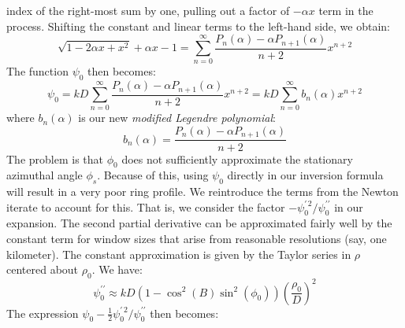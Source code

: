 \documentclass{article}
\begin{document}
        index of the right-most sum by one, pulling out a factor of $-\alpha{x}$
        term in the process. Shifting the constant and linear terms to
        the left-hand side, we obtain:
        \begin{equation}
            \sqrt{1-2\alpha{x}+x^{2}}+\alpha{x}-1
            =\sum_{n=0}^{\infty}
                \frac{P_{n}(\alpha)-\alpha{P}_{n+1}(\alpha)}{n+2}x^{n+2}
        \end{equation}
        The function $\psi_{0}$ then becomes:
        \begin{equation}
            \psi_{0}
            =kD\sum_{n=0}^{\infty}
                \frac{P_{n}(\alpha)-\alpha{P}_{n+1}(\alpha)}{n+2}x^{n+2}
            =kD\sum_{n=0}^{\infty}
                b_{n}(\alpha)x^{n+2}
        \end{equation}
        where $b_{n}(\alpha)$ is our new
        \textit{modified Legendre polynomial}:
        \begin{equation}
            b_{n}(\alpha)=\frac{P_{n}(\alpha)-\alpha{P}_{n+1}(\alpha)}{n+2}
        \end{equation}
        The problem is that $\phi_{0}$ does not sufficiently approximate the
        stationary azimuthal angle $\phi_{s}$. Because of this, using
        $\psi_{0}$ directly in our inversion formula will result in a
        very poor ring profile. We reintroduce the terms from the Newton
        iterate to account for this. That is, we consider the
        factor $-\psi^{\prime\,2}_{0}/\psi^{\prime\prime}_{0}$ in our
        expansion. The second partial
        derivative can be approximated fairly well by the constant term
        for window sizes that arise from reasonable resolutions
        (say, one kilometer). The constant approximation is given by the
        Taylor series in $\rho$ centered about $\rho_{0}$. We have:
        \begin{equation}
            \psi^{\prime\prime}_{0}
            \approx{kD}\left(1-\cos^{2}(B)\sin^{2}(\phi_{0})\right)\left(
                \frac{\rho_{0}}{D}
            \right)^{2}
        \end{equation}
        The expression
        $\psi_{0}-\frac{1}{2}\psi^{\prime\,2}_{0}/\psi^{\prime\prime}_{0}$
        then becomes:
\end{document}
